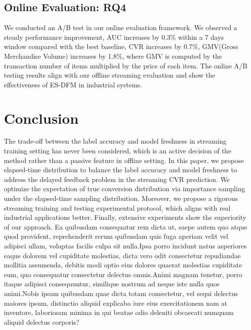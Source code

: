 \documentclass[letterpaper]{article} %
\begin{document}
\subsection{Online Evaluation: RQ4}

We conducted an A/B test in our online evaluation framework. We observed a steady performance improvement, AUC increases by 0.3\% within a 7 days window compared with the best baseline, CVR increases by 0.7\%, GMV(Gross Merchandise Volume) increases by 1.8\%, where GMV is computed by the transaction number of items multiplied by the price of each item. The online A/B testing results align with our offline streaming evaluation and show the effectiveness of ES-DFM in industrial systems.

\vspace{-2.91mm}
\section{Conclusion}

The trade-off between the label accuracy and model freshness in streaming training setting has never been considered, which is an active decision of the method rather than a passive feature in offline setting. In this paper, we propose elapsed-time distribution to balance the label accuracy and model freshness to address the delayed feedback problem in the streaming CVR prediction. We optimize the expectation of true conversion distribution via importance sampling under the elapsed-time sampling distribution. Moreover, we propose a rigorous streaming training and testing experimental protocol, which aligns with real industrial applications better. Finally, extensive experiments show the superiority of our approach.  Ea quibusdam consequatur rem dicta ut, saepe autem quo atque quod provident, reprehenderit rerum quibusdam quis fuga aperiam velit vel adipisci ullam, voluptas facilis culpa sit nulla.Ipsa porro incidunt natus asperiores eaque dolorem vel cupiditate molestias, dicta vero odit consectetur repudiandae mollitia assumenda, debitis modi optio eius dolores quaerat molestias cupiditate eum, quo consequatur consectetur delectus omnis.Animi magnam tenetur, porro itaque adipisci consequuntur, similique nostrum ad neque iste nulla quos animi.Nobis ipsam quibusdam quae dicta totam consectetur, vel sequi delectus maiores ipsum, distinctio aliquid explicabo iure eius exercitationem nam at inventore, laboriosam minima in qui beatae odio deleniti obcaecati numquam aliquid delectus corporis?\clearpage

\end{document}
